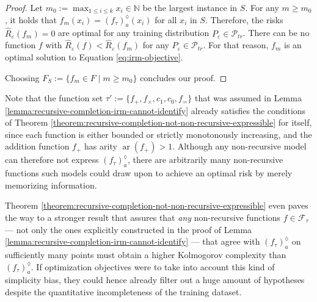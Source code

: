 \begin{proof}
	Let $m_0:=\max_{1\leq i\leq k}x_i \in\mathbb{N}$ be the largest instance in $S$.
	For any $m\geq m_0$, it holds that $f_m(x_i)=\left(f_{\tau}\right)_a^{\lozenge}(x_i)$ for all $x_i$ in $S$.
	Therefore, the risks $\hat{R}_\varepsilon(f_m)=0$ are optimal for any training distribution $P_\varepsilon\in\mathcal{P}_{tr}$.
	There can be no function $f$ with $\hat{R}_{\varepsilon}(f)<\hat{R}_{\varepsilon}(f_m)$ for any $P_\varepsilon\in\mathcal{P}_{tr}$. 
	For that reason, $f_m$ is an optimal solution to Equation \ref{eq:irm-objective}.
	
	Choosing $F_S:=\{f_m\in F\mid m\geq m_0\}$ concludes our proof.
\end{proof}

Note that the function set $\tau':=\{f_{+},f_{\times},c_1,c_0,f_{=}\}$ that was assumed in Lemma \ref{lemma:recursive-completion-irm-cannot-identify} already satisfies the conditions of Theorem \ref{theorem:recursive-completion-not-non-recursive-expressible} for itself, since each function is either bounded or strictly monotonously increasing, and the addition function $f_{+}$ has arity $\operatorname{ar}(f_{+})>1$.
Although any non-recursive model can therefore not express $\left(f_{\tau}\right)_a^{\lozenge}$, there are arbitrarily many non-recursive functions such models could draw upon to achieve an optimal risk by merely memorizing information.

Theorem \ref{theorem:recursive-completion-not-non-recursive-expressible} even paves the way to a stronger result that assures that \textit{any} non-recursive functions $f\in\mathcal{F}_{\tau}$ --- not only the ones explicitly constructed in the proof of Lemma \ref{lemma:recursive-completion-irm-cannot-identify} --- that agree with $\left(f_{\tau}\right)_a^{\lozenge}$ on sufficiently many points must obtain a higher Kolmogorov complexity than $\left(f_{\tau}\right)_a^{\lozenge}$.
If optimization objectives were to take into account this kind of simplicity bias, they could hence already filter out a huge amount of hypotheses despite the quantitative incompleteness of the training dataset.

